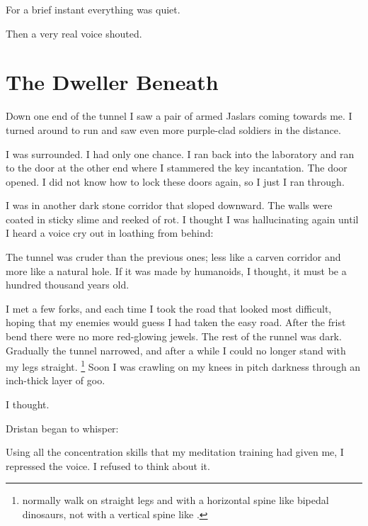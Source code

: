 \documentclass
  [a4paper,
   12pt,
   oneside
  ]%
  {article}
\begin{document}
For a brief instant everything was quiet.

Then a very real voice shouted. 










\section{The Dweller Beneath}
Down one end of the tunnel I saw a pair of armed Jaslars coming towards me. 
I turned around to run and saw even more purple-clad soldiers in the distance. 

I was surrounded. 
I had only one chance. 
I ran back into the laboratory and ran to the door at the other end where I stammered the key incantation. 
The door opened. 
I did not know how to lock these doors again, so I just I ran through.

I was in another dark stone corridor that sloped downward. 
The walls were coated in sticky slime and reeked of rot. 
I thought I was hallucinating again until I heard a voice cry out in loathing from behind: 

The tunnel was cruder than the previous ones; less like a carven corridor and more like a natural hole. 
If it was made by humanoids, I thought, it must be a hundred thousand years old. 

I met a few forks, and each time I took the road that looked most difficult, hoping that my enemies would guess I had taken the easy road. 
After the frist bend there were no more red-glowing jewels. 
The rest of the runnel was dark. 
Gradually the tunnel narrowed, and after a while I could no longer stand with my legs straight.%
\footnote{\Scathae normally walk on straight legs and with a horizontal spine like bipedal dinosaurs, not with a vertical spine like \humans.} 
Soon I was crawling on my knees in pitch darkness through an inch-thick layer of goo. 

 I thought.

Dristan began to whisper: 

Using all the concentration skills that my meditation training had given me, I repressed the voice. 
I refused to think about it. 
\end{document}
